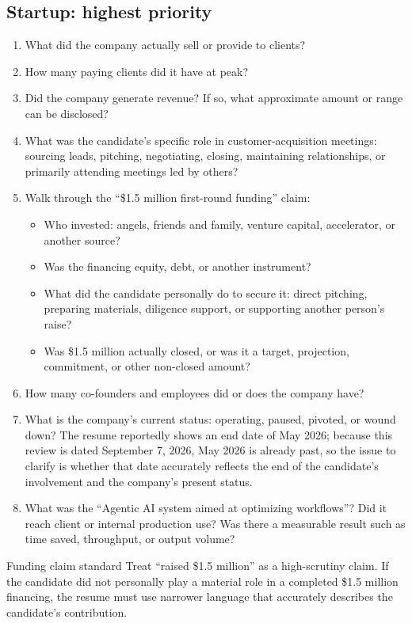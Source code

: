 \documentclass{reportkit}
\begin{document}
\subsection{Startup: highest priority}
\begin{enumerate}
  \item What did the company actually sell or provide to clients?
  \item How many paying clients did it have at peak?
  \item Did the company generate revenue? If so, what approximate amount or range can be disclosed?
  \item What was the candidate's specific role in customer-acquisition meetings: sourcing leads, pitching, negotiating, closing, maintaining relationships, or primarily attending meetings led by others?
  \item Walk through the ``\$1.5 million first-round funding'' claim:
  \begin{itemize}
    \item Who invested: angels, friends and family, venture capital, accelerator, or another source?
    \item Was the financing equity, debt, or another instrument?
    \item What did the candidate personally do to secure it: direct pitching, preparing materials, diligence support, or supporting another person's raise?
    \item Was \$1.5 million actually closed, or was it a target, projection, commitment, or other non-closed amount?
  \end{itemize}
  \item How many co-founders and employees did or does the company have?
  \item What is the company's current status: operating, paused, pivoted, or wound down? The resume reportedly shows an end date of May 2026; because this review is dated September 7, 2026, May 2026 is already past, so the issue to clarify is whether that date accurately reflects the end of the candidate's involvement and the company's present status.
  \item What was the ``Agentic AI system aimed at optimizing workflows''? Did it reach client or internal production use? Was there a measurable result such as time saved, throughput, or output volume?
\end{enumerate}

\begin{redflag}{Funding claim standard}
Treat ``raised \$1.5 million'' as a high-scrutiny claim. If the candidate did not personally play a material role in a completed \$1.5 million financing, the resume must use narrower language that accurately describes the candidate's contribution.
\end{redflag}
\end{document}
